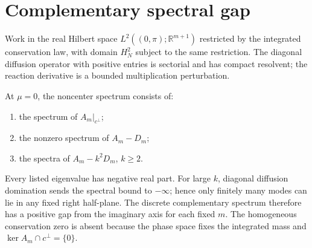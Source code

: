 \section*{Complementary spectral gap}
Work in the real Hilbert space
$L^2((0,\pi);\mathbb R^{m+1})$ restricted by the integrated conservation law,
with domain $H_N^2$ subject to the same restriction.  The diagonal diffusion
operator with positive entries is sectorial and has compact resolvent; the
reaction derivative is a bounded multiplication perturbation.

At $\mu=0$, the noncenter spectrum consists of:
\begin{enumerate}
\item the spectrum of $A_m|_{c^\perp}$;
\item the nonzero spectrum of $A_m-D_m$;
\item the spectra of $A_m-k^2D_m$, $k\ge2$.
\end{enumerate}
Every listed eigenvalue has negative real part.  For large $k$, diagonal
diffusion domination sends the spectral bound to $-\infty$; hence only
finitely many modes can lie in any fixed right half-plane.  The discrete
complementary spectrum therefore has a positive gap from the imaginary axis
for each fixed $m$.  The homogeneous conservation zero is absent because the
phase space fixes the integrated mass and $\ker A_m\cap c^\perp=\{0\}$.
